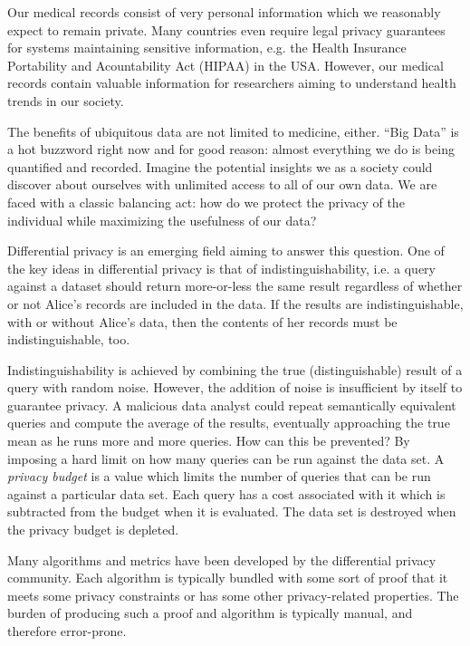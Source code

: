 \documentclass[12pt]{article}
\begin{document}
Our medical records consist of very personal information which we reasonably expect to remain private.
Many countries even require legal privacy guarantees for systems maintaining sensitive information, e.g. the Health Insurance Portability and Acountability Act (HIPAA) in the USA.
However, our medical records contain valuable information for researchers aiming to understand health trends in our society.

The benefits of ubiquitous data are not limited to medicine, either.
``Big Data'' is a hot buzzword right now and for good reason: almost everything we do is being quantified and recorded.
Imagine the potential insights we as a society could discover about ourselves with unlimited access to all of our own data.
We are faced with a classic balancing act: how do we protect the privacy of the individual while maximizing the usefulness of our data?

Differential privacy is an emerging field aiming to answer this question\cite{journals/cacm/Dwork11}.
One of the key ideas in differential privacy is that of indistinguishability, i.e. a query against a dataset should return more-or-less the same result regardless of whether or not Alice's records are included in the data.
If the results are indistinguishable, with or without Alice's data, then the contents of her records must be indistinguishable, too.

Indistinguishability is achieved by combining the true (distinguishable) result of a query with random noise.
However, the addition of noise is insufficient by itself to guarantee privacy.
A malicious data analyst could repeat semantically equivalent queries and compute the average of the results, eventually approaching the true mean as he runs more and more queries.
How can this be prevented?
By imposing a hard limit on how many queries can be run against the data set.
A \textit{privacy budget} is a value which limits the number of queries that can be run against a particular data set.
Each query has a cost associated with it which is subtracted from the budget when it is evaluated.
The data set is destroyed when the privacy budget is depleted.

Many algorithms and metrics have been developed by the differential privacy community.
Each algorithm is typically bundled with some sort of proof that it meets some privacy constraints or has some other privacy-related properties.
The burden of producing such a proof and algorithm is typically manual, and therefore error-prone.
\end{document}
